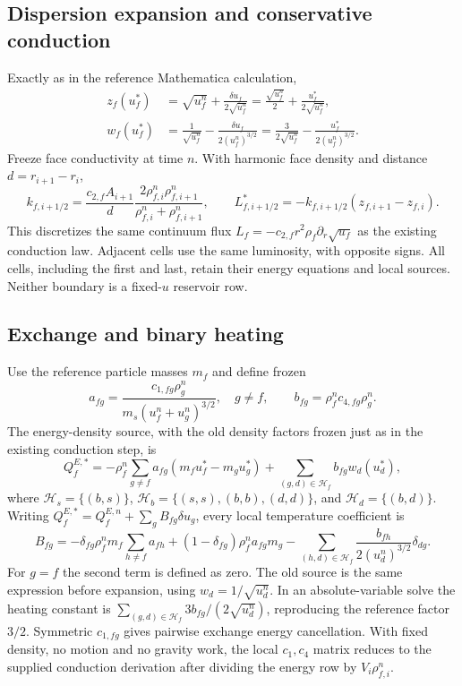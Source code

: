 \documentclass[11pt]{article}
\begin{document}
\subsection{Dispersion expansion and conservative conduction}
Exactly as in the reference Mathematica calculation,
\begin{align}
 z_f(u_f^*)&=\sqrt{u_f^n}+\frac{\delta u_f}{2\sqrt{u_f^n}}
 =\frac{\sqrt{u_f^n}}2+\frac{u_f^*}{2\sqrt{u_f^n}},\\
 w_f(u_f^*)&=\frac1{\sqrt{u_f^n}}-
 \frac{\delta u_f}{2(u_f^n)^{3/2}}
 =\frac3{2\sqrt{u_f^n}}-\frac{u_f^*}{2(u_f^n)^{3/2}}.
 \label{eq:dispersion}
\end{align}
Freeze face conductivity at time $n$. With harmonic face density and
distance $d=r_{i+1}-r_i$,
\begin{equation}
 k_{f,i+1/2}=\frac{c_{2,f}A_{i+1}}{d}
      \frac{2\rho_{f,i}^n\rho_{f,i+1}^n}{\rho_{f,i}^n+\rho_{f,i+1}^n},\qquad
 L_{f,i+1/2}^*=-k_{f,i+1/2}(z_{f,i+1}-z_{f,i}).
 \label{eq:conductiveflux}
\end{equation}
This discretizes the same continuum flux
$L_f=-c_{2,f}r^2\rho_f\partial_r\sqrt{u_f}$ as the existing conduction
law. Adjacent cells use the same luminosity, with opposite signs.
All cells, including the first and last, retain their energy equations
and local sources. Neither boundary is a fixed-$u$ reservoir row.

\subsection{Exchange and binary heating}
Use the reference particle masses $m_f$ and define frozen
\begin{equation}
 a_{fg}=\frac{c_{1,fg}\rho_g^n}
 {m_s(u_f^n+u_g^n)^{3/2}},\quad g\ne f,\qquad
 b_{fg}=\rho_f^n c_{4,fg}\rho_g^n.
\end{equation}
The energy-density source, with the old density factors frozen just as
in the existing conduction step, is
\begin{equation}
 Q_f^{E,*}=-\rho_f^n\sum_{g\ne f}a_{fg}(m_fu_f^*-m_gu_g^*)
       +\sum_{(g,d)\in\mathcal H_f}b_{fg}w_d(u_d^*),
\end{equation}
where
$\mathcal H_s=\{(b,s)\}$,
$\mathcal H_b=\{(s,s),(b,b),(d,d)\}$, and
$\mathcal H_d=\{(b,d)\}$.
Writing $Q_f^{E,*}=Q_f^{E,n}+\sum_g B_{fg}\delta u_g$, every local
temperature coefficient is
\begin{equation}
 \boxed{B_{fg}=-\delta_{fg}\rho_f^nm_f\sum_{h\ne f}a_{fh}
 +(1-\delta_{fg})\rho_f^na_{fg}m_g
 -\sum_{(h,d)\in\mathcal H_f}\frac{b_{fh}}{2(u_d^n)^{3/2}}\delta_{dg}.}
 \label{eq:thermaljac}
\end{equation}
For $g=f$ the second term is defined as zero. The old source is the
same expression before expansion, using $w_d=1/\sqrt{u_d^n}$.
In an absolute-variable solve the heating constant is
$\sum_{(g,d)\in\mathcal H_f}3b_{fg}/(2\sqrt{u_d^n})$, reproducing the
reference factor $3/2$. Symmetric $c_{1,fg}$ gives pairwise exchange
energy cancellation. With fixed density, no motion and no gravity work,
the local $c_1,c_4$ matrix reduces to the supplied conduction derivation
after dividing the energy row by $V_i\rho_{f,i}^n$.
\end{document}
